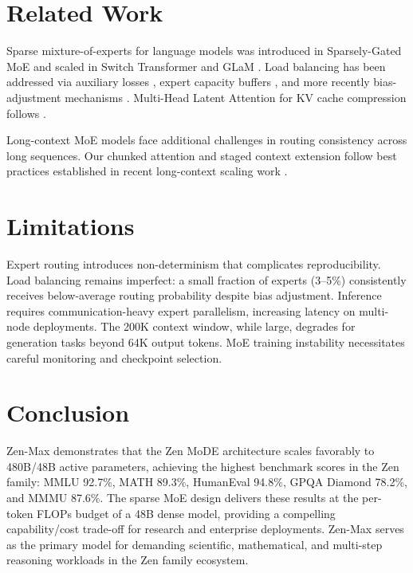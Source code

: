 \documentclass[11pt,a4paper]{article}
\begin{document}
\section{Related Work}

Sparse mixture-of-experts for language models was introduced in Sparsely-Gated MoE
\cite{shazeer2017outrageously} and scaled in Switch Transformer \cite{fedus2022switch}
and GLaM \cite{du2022glam}. Load balancing has been addressed via auxiliary losses
\cite{fedus2022switch}, expert capacity buffers \cite{lepikhin2020gshard}, and more
recently bias-adjustment mechanisms \cite{deepseekmoe2024}. Multi-Head Latent Attention
for KV cache compression follows \cite{liu2024deepseekv2}.

Long-context MoE models face additional challenges in routing consistency across long
sequences. Our chunked attention and staged context extension follow best practices
established in recent long-context scaling work \cite{peng2023yarn, hsieh2024ruler}.

\section{Limitations}

Expert routing introduces non-determinism that complicates reproducibility. Load balancing
remains imperfect: a small fraction of experts (3--5\%) consistently receives below-average
routing probability despite bias adjustment. Inference requires communication-heavy expert
parallelism, increasing latency on multi-node deployments. The 200K context window, while
large, degrades for generation tasks beyond 64K output tokens. MoE training instability
necessitates careful monitoring and checkpoint selection.

\section{Conclusion}

Zen-Max demonstrates that the Zen MoDE architecture scales favorably to 480B/48B active
parameters, achieving the highest benchmark scores in the Zen family: MMLU 92.7\%, MATH
89.3\%, HumanEval 94.8\%, GPQA Diamond 78.2\%, and MMMU 87.6\%. The sparse MoE design
delivers these results at the per-token FLOPs budget of a 48B dense model, providing a
compelling capability/cost trade-off for research and enterprise deployments. Zen-Max
serves as the primary model for demanding scientific, mathematical, and multi-step reasoning
workloads in the Zen family ecosystem.
\end{document}
